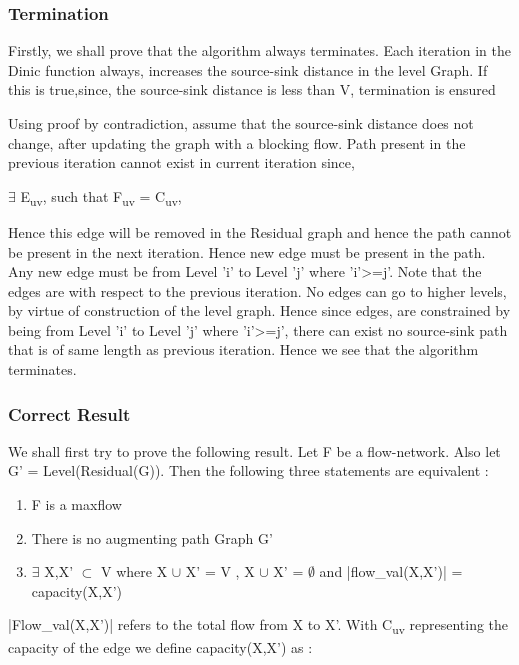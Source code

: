 \documentclass[paper=a4, fontsize=11pt]{scrartcl} %
\numberwithin{equation}{section} %
\numberwithin{figure}{section} %
\numberwithin{table}{section} %
\begin{document}
\subsubsection{Termination}
Firstly, we shall prove that the algorithm always terminates. Each iteration in the Dinic function always, increases the source-sink distance in the level Graph. If this is true,since, the source-sink distance is less than V, termination is ensured

Using proof by contradiction, assume that the source-sink distance does not change, after updating the graph with a blocking flow. Path present in the previous iteration cannot exist in current iteration since, 

\vspace{5mm} 
\(\exists\) E\textsubscript{uv}, such that F\textsubscript{uv} = C\textsubscript{uv}, 

\vspace{5mm} 

Hence this edge will be removed in the Residual graph and hence the path cannot be present in the next iteration.
Hence new edge must be present in the path. Any new edge must be from Level 'i' to Level 'j' where 'i'>=j'. Note that the edges are with respect to the previous iteration. No edges can go to higher levels, by virtue of construction of the level graph. Hence since edges, are constrained by being from Level 'i' to Level 'j' where 'i'>=j', there can exist no source-sink path that is of same length as previous iteration. Hence we see that the algorithm terminates.


\subsubsection{Correct Result}


We shall first try to prove the following result.
Let F be a flow-network. Also let G' = Level(Residual(G)).  Then the following three statements are equivalent :

\begin{enumerate}  
\item F is a maxflow 
\item There is no augmenting path Graph G' 
\item \(\exists\) X,X' \(\subset\) V where X \(\cup\) X' = V , X \(\cup\) X' = \(\emptyset\) and |flow\_val(X,X')| = capacity(X,X') 
\end{enumerate}


|Flow\_val(X,X')| refers to the total flow from X to X'. With C\textsubscript{uv} representing the capacity of the edge we define capacity(X,X') as :
\end{document}
